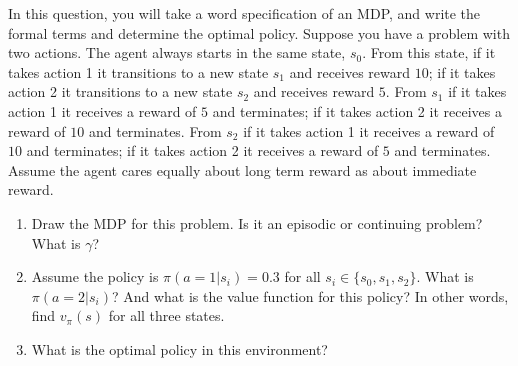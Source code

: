 In this question, you will take a word specification of an MDP, and write the formal terms and determine the optimal policy. Suppose you have a problem with two actions. The agent always starts in the same state, $s_0$. From this state, if it takes action 1 it transitions to a new state $s_1$ and receives reward $10$; if it takes action 2 it transitions to a new state $s_2$ and receives reward $5$. From $s_1$ if it takes action 1 it receives a reward of $5$ and terminates; if it takes action 2 it receives a reward of $10$ and terminates. From $s_2$ if it takes action 1 it receives a reward of $10$ and terminates; if it takes action 2 it receives a reward of $5$ and terminates. Assume the agent cares equally about long term reward as about immediate reward.
\begin{enumerate}
\item Draw the MDP for this problem. Is it an episodic or continuing problem? What is $\gamma$? %
\item Assume the policy is $\pi(a = 1|s_i) = 0.3$ for all $s_i \in \{s_0, s_1, s_2\}$. %
What is $\pi(a = 2 | s_i)$? And what is the value function for this policy?  In other words, find $v_{\pi}(s)$
for all three states. %
\item What is the optimal policy in this environment?
\end{enumerate}
\bigspace

